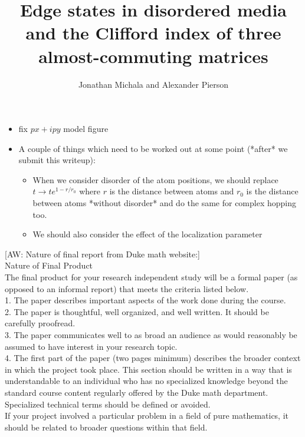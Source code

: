 \documentclass[a4paper]{article}
\title{Edge states in disordered media and the Clifford index of three almost-commuting matrices}
\author{Jonathan Michala and Alexander Pierson}
\newcommand{\aw}[1]{{\color{blue} [AW: #1]}}
\begin{document}
\begin{itemize}
\item fix $px + i py$ model figure
\item A couple of things which need to be worked out at some point (*after* we submit this writeup):
\begin{itemize}
\item When we consider disorder of the atom positions, we should replace $t \rightarrow t e^{1 - r/r_0}$ where $r$ is the distance between atoms and $r_0$ is the distance between atoms *without disorder* and do the same for complex hopping too.
\item We should also consider the effect of the localization parameter
\end{itemize}
\end{itemize}
\aw{Nature of final report from Duke math website:} \\

Nature of Final Product \\

The final product for your research independent study will be a formal paper (as opposed to an informal report) that meets the criteria listed below. \\

1. The paper describes important aspects of the work done during the course. \\

2. The paper is thoughtful, well organized, and well written. It should be carefully proofread. \\

3. The paper communicates well to as broad an audience as would reasonably be assumed to have interest in your research topic. \\

4. The first part of the paper (two pages minimum) describes the broader context in which the project took place. This section should be written in a way that is understandable to an individual who has no specialized knowledge beyond the standard course content regularly offered by the Duke math department. \\

Specialized technical terms should be defined or avoided. \\

If your project involved a particular problem in a field of pure mathematics, it should be related to broader questions within that field. \\
\end{document}
